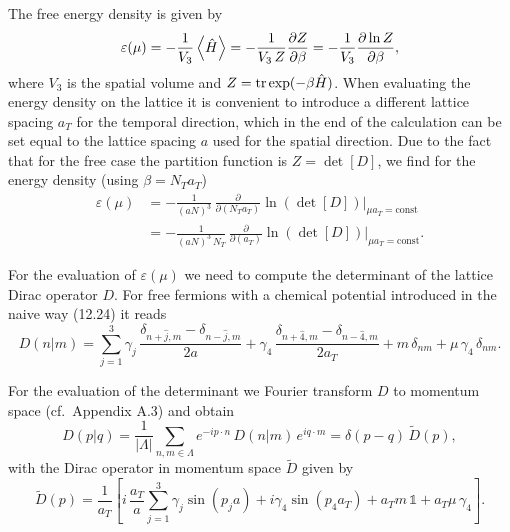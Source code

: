 The free energy density is given by
\begin{equation}
  \varepsilon(\mu) = -\frac{1}{V_3}\left\langle \hat{H} \right\rangle
    = -\frac{1}{V_3\,Z}\frac{\partial Z}{\partial\beta}
    = -\frac{1}{V_3}\frac{\partial\ln Z}{\partial\beta},
\end{equation}
where $V_3$ is the spatial volume and $Z = \operatorname{tr}\exp(-\beta\hat{H})$. When
evaluating the energy density on the lattice it is convenient to introduce a
different lattice spacing $a_T$ for the temporal direction, which in the end of
the calculation can be set equal to the lattice spacing $a$ used for the
spatial direction. Due to the fact that for the free case the partition
function is $Z = \det[D]$, we find for the energy density (using
$\beta = N_T a_T$)
\begin{equation}
\begin{split}
  \varepsilon(\mu) &= -\frac{1}{(aN)^3}\,
    \frac{\partial}{\partial(N_T a_T)}\ln(\det[D])\Bigg|_{\mu a_T=\mathrm{const}}\\
  &= -\frac{1}{(aN)^3\,N_T}\,
    \frac{\partial}{\partial(a_T)}\ln(\det[D])\Bigg|_{\mu a_T=\mathrm{const}}.
\end{split}
\end{equation}

For the evaluation of $\varepsilon(\mu)$ we need to compute the determinant of
the lattice Dirac operator $D$. For free fermions with a chemical potential
introduced in the naive way (12.24) it reads
\begin{equation}
  D(n|m) = \sum_{j=1}^3 \gamma_j\,
    \frac{\delta_{n+\hat{j},m} - \delta_{n-\hat{j},m}}{2a}
    + \gamma_4\,\frac{\delta_{n+\hat{4},m} - \delta_{n-\hat{4},m}}{2a_T}
    + m\,\delta_{nm} + \mu\,\gamma_4\,\delta_{nm}.
\end{equation}

For the evaluation of the determinant we Fourier transform $D$ to momentum
space (cf.\ Appendix A.3) and obtain
\begin{equation}
  D(p|q) = \frac{1}{|\Lambda|}\sum_{n,m\in\Lambda} e^{-ip\cdot n}\,
    D(n|m)\,e^{iq\cdot m} = \delta(p-q)\,\tilde{D}(p),
\end{equation}
with the Dirac operator in momentum space $\tilde{D}$ given by
\begin{equation}
  \tilde{D}(p) = \frac{1}{a_T}\left[
    i\,\frac{a_T}{a}\sum_{j=1}^3\gamma_j\sin(p_j a)
    + i\gamma_4\sin(p_4 a_T) + a_T m\,\mathbb{1} + a_T\mu\,\gamma_4
  \right].
\end{equation}

